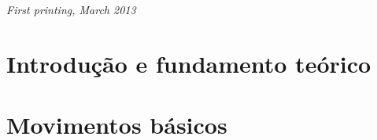 \documentclass[11pt,fleqn]{book} %
\begin{document}
\noindent \textit{First printing, March 2013} %



\pagestyle{empty} %

\tableofcontents %

\cleardoublepage %

\pagestyle{fancy} %


\part{Introdução e fundamento teórico}









\part{Movimentos básicos}






\end{document}
